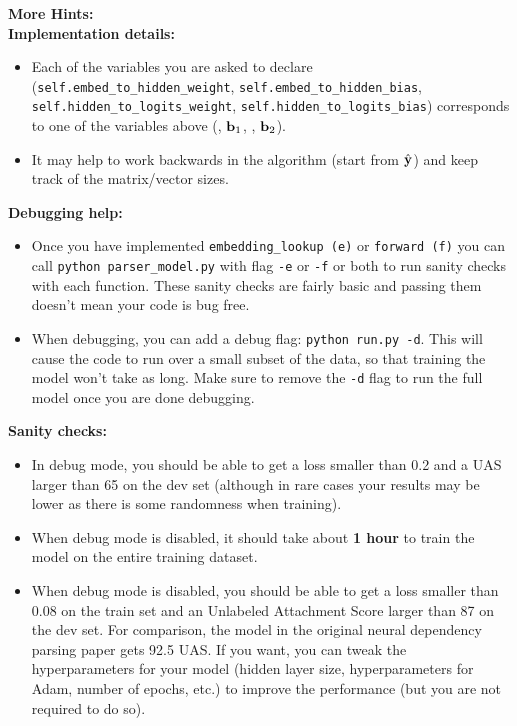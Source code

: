 \begin{parts}
    \textbf{More Hints:}\\
    \textbf{Implementation details:}
    \begin{itemize}
        \item Each of the variables you are asked to declare (\texttt{self.embed\_to\_hidden\_weight}, \newline \texttt{self.embed\_to\_hidden\_bias}, \texttt{self.hidden\_to\_logits\_weight}, \newline \texttt{self.hidden\_to\_logits\_bias}) corresponds to one of the variables above (\bW, $\mathbf{b}_1$, \bU, $\mathbf{b}_2$).
        \item It may help to work backwards in the algorithm (start from $\hat{\mathbf{y}}$) and keep track of the matrix/vector sizes.
    \end{itemize}
    \textbf{Debugging help:}
    \begin{itemize}
        \item Once you have implemented \texttt{embedding\_lookup (e)} or \texttt{forward (f)} you can call \texttt{python parser\_model.py} with flag \texttt{-e} or \texttt{-f} or both to run sanity checks with each function. These sanity checks are fairly basic and passing them doesn't mean your code is bug free.
        \item
        When debugging, you can add a debug flag: \texttt{python run.py -d}. This will cause the code to run over a small subset of the data, so that training the model won't take as long. Make sure to remove the \texttt{-d} flag to run the full model once you are done debugging.
    \end{itemize}
    \textbf{Sanity checks:}
    \begin{itemize}
        \item
        In debug mode, you should be able to get a loss smaller than 0.2 and a UAS larger than 65 on the dev set (although in rare cases your results may be lower as there is some randomness when training).

        \item When debug mode is disabled, it should take about \textbf{1 hour} to train the model on the entire training dataset.

        \item When debug mode is disabled, you should be able to get a loss smaller than 0.08 on the train set and an Unlabeled Attachment Score larger than 87 on the dev set. For comparison, the model in the original neural dependency parsing paper gets 92.5 UAS. If you want, you can tweak the hyperparameters for your model (hidden layer size, hyperparameters for Adam, number of epochs, etc.) to improve the performance (but you are not required to do so).
    \end{itemize}


\end{parts}
